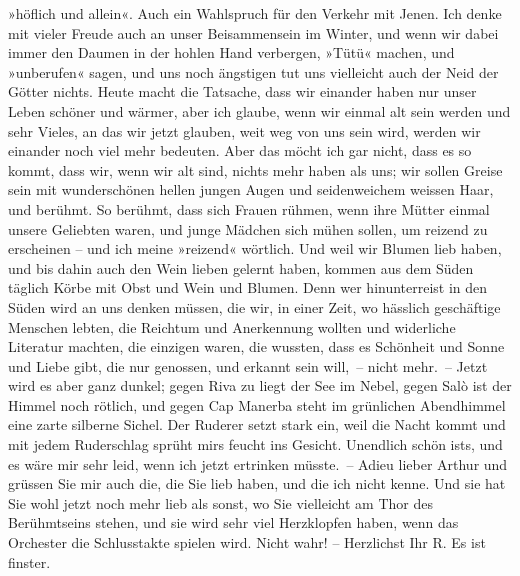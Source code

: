 \begin{ledgroupsized}[t]{13cm}
               »höflich und allein«. Auch ein Wahlspruch für den Verkehr mit Jenen. Ich denke mit
               vieler Freude auch an unser Beisammensein im Winter, und wenn wir dabei immer den
               Daumen in der hohlen Hand verbergen, »Tütü« machen, und »unberufen« sagen, und uns
               noch ängstigen tut uns vielleicht auch der Neid der Götter nichts. Heute macht die
               Tatsache, dass wir einander haben nur unser Leben schöner und wärmer, aber ich
               glaube, wenn wir einmal alt sein werden und sehr Vieles, an das wir jetzt glauben,
               weit weg von uns sein wird, werden wir einander noch viel mehr bedeuten. Aber das
               möcht ich gar nicht, dass es so kommt, {\pb}dass wir, wenn
               wir alt sind, nichts mehr haben als uns; wir sollen Greise sein mit wunderschönen
               hellen jungen Augen und seidenweichem weissen Haar, und  berühmt. So berühmt, dass sich Frauen rühmen, wenn ihre Mütter einmal
               unsere Geliebten waren, und junge Mädchen sich mühen sollen, um reizend zu erscheinen
               – und ich meine »reizend« wörtlich. Und weil wir Blumen lieb haben, und bis dahin
               auch den Wein lieben gelernt haben, kommen aus dem Süden täglich Körbe mit Obst und
               Wein und Blumen. Denn wer hinunterreist in den Süden wird an uns denken müssen, die
               wir, in einer Zeit, wo hässlich geschäftige Menschen lebten, die Reichtum und
               Anerkennung wollten und widerliche Literatur machten, die einzigen waren, die
               wussten, dass es Schönheit und Sonne und Liebe gibt, die nur genossen, und erkannt
               sein will, – nicht mehr. – Jetzt wird es aber ganz dunkel; gegen Riva zu liegt der See im Nebel, gegen Salò ist der Himmel noch rötlich, und gegen Cap Manerba steht im grünlichen Abendhimmel eine zarte silberne
                  {\pb}Sichel. Der Ruderer setzt stark ein, weil die
               Nacht kommt und mit jedem Ruderschlag sprüht mirs feucht ins Gesicht. Unendlich schön
               ists, und es wäre mir sehr leid, wenn ich jetzt ertrinken müsste. – Adieu lieber
               Arthur und grüssen Sie mir auch die, die Sie lieb haben, und die ich nicht kenne. Und
               sie hat Sie wohl jetzt noch mehr lieb als sonst, wo Sie vielleicht am Thor des
               Berühmtseins stehen, und sie wird sehr viel Herzklopfen haben, wenn das Orchester die
               Schlusstakte spielen wird. Nicht wahr! – Herzlichst Ihr\pend
           \pstart \spacefill\mbox{R.}\pend{}\pstart
           \noindent{}Es ist finster.\pend
           
         
         \endnumbering{}\end{ledgroupsized}  \newcommand{\dateiname}{L00493}\newcommand{\titel}{Richard Beer-Hofmann an Arthur Schnitzler, 24. 9. 1895}\newcommand{\editorInnen}{Martin Anton Müller und Gerd-Hermann Susen}
      